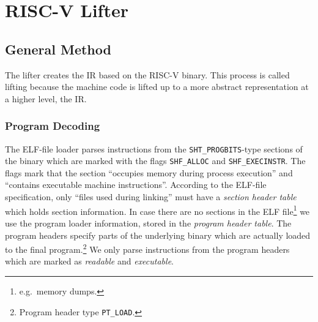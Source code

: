 \documentclass[course=eragp]{aspdoc}
\begin{document}
\section{RISC-V Lifter}\label{sec:riscv_lifter}
\subsection{General Method}



The lifter creates the IR based on the RISC-V binary. This process is called lifting because the
machine code is lifted up to a more abstract representation at a higher level, the IR.

\subsubsection{Program Decoding}

The ELF-file loader parses instructions from the \texttt{SHT\_PROGBITS}-type sections of the binary
which are marked with the flags
\texttt{SHF\_ALLOC} and \texttt{SHF\_EXECINSTR}. The flags mark that the section ``occupies memory during
process execution''\cite{elf_spec} and ``contains executable machine
instructions''\cite{elf_spec}. According to the ELF-file specification, only ``files used
during linking''\cite{elf_spec} must have a \emph{section header table} which holds section
information. In case there are no sections in the ELF file\footnote{e.g.\ memory dumps.} we use the
program loader information, stored in the \emph{program header table}. The program headers
specify parts of the underlying binary which are actually loaded to the final program.\footnote{Program header type \texttt{PT\_LOAD}.}
We only parse instructions from the program headers which are marked as \emph{readable} and
\emph{executable}.
\end{document}
